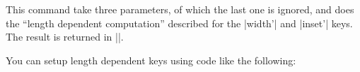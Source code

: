 \begin{command}{\pgfarrowslengthdependent{}}
  This command take three parameters, of which the last one is
  ignored, and does the ``length dependent computation'' described for
  the |width'| and |inset'| keys. The result is returned in |\pgf@x|.

  You can setup length dependent keys using code like the following:
\begin{codeexample}[code only]
\pgfkeys{/pgf/arrow keys/depth'/.code={%
  \pgfarrowsthreeparameters{#1}%
  \expandafter\pgfarrowsaddtolateoptions\expandafter{%
    \expandafter\pgfarrowslengthdependent\pgfarrowstheparameters%
    \pgfarrowdepth\pgf@x%
  }%
}    
\end{codeexample}
\end{command}


